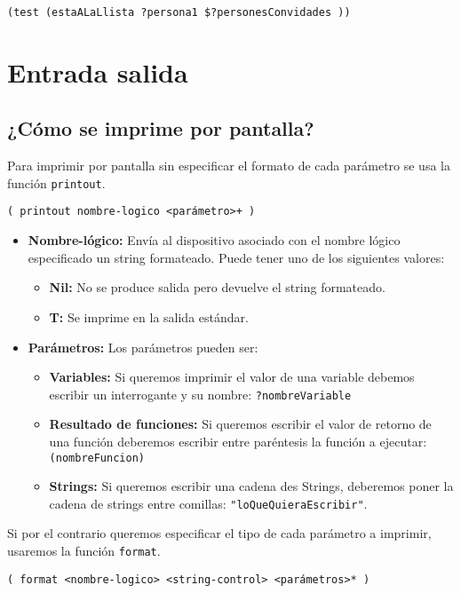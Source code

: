 \documentclass[11pt,svgnames]{scrbook}
\begin{document}
\texttt{(test (estaALaLlista ?persona1 \$?personesConvidades ))}


\section{Entrada salida}

\subsection{¿Cómo se imprime por pantalla?}

	Para imprimir por pantalla sin especificar el formato de cada parámetro
se usa la función \texttt{printout}.

\texttt{(   printout  nombre-logico  <parámetro>+  )}


\begin{itemize}
 \item \textbf{Nombre-lógico:} Envía al dispositivo asociado con el nombre
lógico especificado
un string formateado. Puede tener uno de los siguientes valores:
\begin{itemize}
 \item \textbf{Nil:} No se produce salida pero devuelve el string formateado.
\item \textbf{T:} Se imprime en la salida estándar.
\end{itemize}
\item\textbf{ Parámetros:} Los parámetros pueden ser:
\begin{itemize}
 \item \textbf{Variables:}  Si queremos imprimir el valor de una variable
debemos escribir un
interrogante y su nombre:  \texttt{?nombreVariable}
\item \textbf{Resultado de funciones:}  Si queremos escribir el valor de retorno
de una función
deberemos escribir entre paréntesis la función a ejecutar:
\texttt{(nombreFuncion)}
\item \textbf{Strings:} Si queremos escribir una cadena des Strings, deberemos
poner la cadena
de strings entre comillas: \texttt{"loQueQuieraEscribir"}.
\end{itemize}




\end{itemize}




Si por el contrario queremos especificar el tipo de cada parámetro a imprimir,
usaremos la función \texttt{format}.

\texttt{(   format    <nombre-logico>     <string-control>     <parámetros>*
)}
\end{document}
